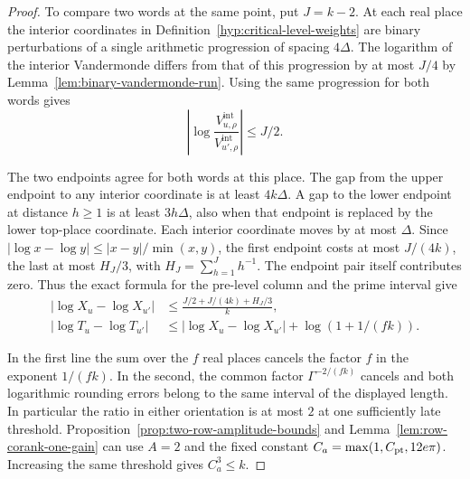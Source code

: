 \begin{proof}
To compare two words at the same point, put \(J=k-2\).
At each real place the interior coordinates in
Definition~\ref{hyp:critical-level-weights} are binary perturbations
of a single arithmetic progression of spacing \(4\Delta\). The
logarithm of the interior Vandermonde differs from that of this
progression by at most \(J/4\) by Lemma~\ref{lem:binary-vandermonde-run}.
Using the same progression for both words gives
\[
 \left|\log\frac{V^{\mathrm{int}}_{u,\rho}}
                         {V^{\mathrm{int}}_{u',\rho}}\right|\le J/2 .
\]


The two endpoints agree for both words at this place. The gap from
the upper endpoint to any interior coordinate is at least
\(4k\Delta\). A gap to the lower endpoint at distance \(h\ge1\)
is at least \(3h\Delta\), also when that endpoint is replaced by
the lower top-place coordinate. Each interior coordinate moves by at
most \(\Delta\). Since \(|\log x-\log y|\le|x-y|/\min(x,y)\), the first
endpoint costs at most \(J/(4k)\), the last at most \(H_J/3\), with
\(H_J=\sum_{h=1}^J h^{-1}\). The endpoint pair itself contributes zero.
Thus the exact formula for the pre-level column and the prime interval give
\[
 \begin{aligned}
 |\log X_u-\log X_{u'}|
 &\le \frac{J/2+J/(4k)+H_J/3}{k},\\
 |\log T_u-\log T_{u'}|
 &\le |\log X_u-\log X_{u'}|+\log(1+1/(fk)).
 \end{aligned}
\]


In the first line the sum over the \(f\) real places cancels the
factor \(f\) in the exponent \(1/(fk)\). In the second, the common
factor \(\Gamma^{-2/(fk)}\) cancels and both logarithmic rounding
errors belong to the same interval of the displayed length. In
particular the ratio in either orientation is at most \(2\) at
one sufficiently late threshold. Proposition~\ref{prop:two-row-amplitude-bounds}
and Lemma~\ref{lem:row-corank-one-gain} can use \(A=2\) and the fixed
constant \(C_a=\max(1,C_{\rm pt},12e\pi)\). Increasing the same
threshold gives \(C_a^3\le k\).
\end{proof}
